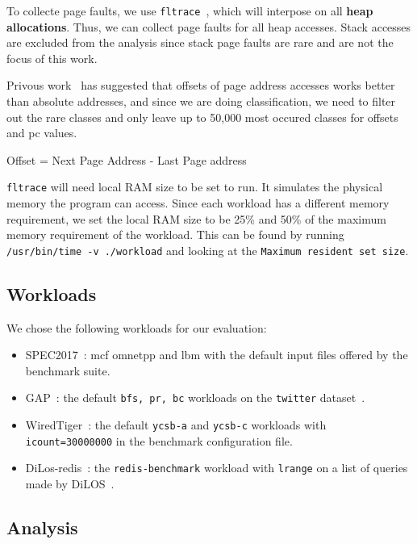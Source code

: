 To collecte page faults, we use \texttt{fltrace}~\cite{fltrace}, which will interpose on all \textbf{heap allocations}. Thus, we can collect page faults for all heap accesses. Stack accesses are excluded from the analysis since stack page faults are rare and are not the focus of this work.

Privous work~\cite{LMAP} has suggested that offsets of page address accesses works better than absolute addresses, and since we are doing classification, we need to filter out the rare classes and only leave up to 50,000 most occured classes for offsets and pc values.

\begin{definition}
    {Offset} = {Next Page Address} - {Last Page address}
\end{definition}

\texttt{fltrace} will need local RAM size to be set to run. It simulates the physical memory the program can access. Since each workload has a different memory requirement, we set the local RAM size to be 25\% and 50\% of the maximum memory requirement of the workload. This can be found by running \texttt{/usr/bin/time -v ./workload} and looking at the \texttt{Maximum resident set size}.

\subsection{Workloads}

We chose the following workloads for our evaluation:\begin{itemize}
    \item SPEC2017~\cite{SPEC2017}: mcf omnetpp and lbm with the default input files offered by the benchmark suite.
    \item GAP~\cite{gapbs}: the default \texttt{bfs, pr, bc} workloads on the \texttt{twitter} dataset~\cite{twitter-dataset}.
    \item WiredTiger~\cite{wiredtiger}: the default \texttt{ycsb-a} and \texttt{ycsb-c} workloads with \texttt{icount=30000000} in the benchmark configuration file.
    \item DiLos-redis~\cite{redis, dilos}: the \texttt{redis-benchmark} workload with \texttt{lrange} on a list of queries made by DiLOS~\cite{dilos}.
\end{itemize}

\subsection{Analysis}

